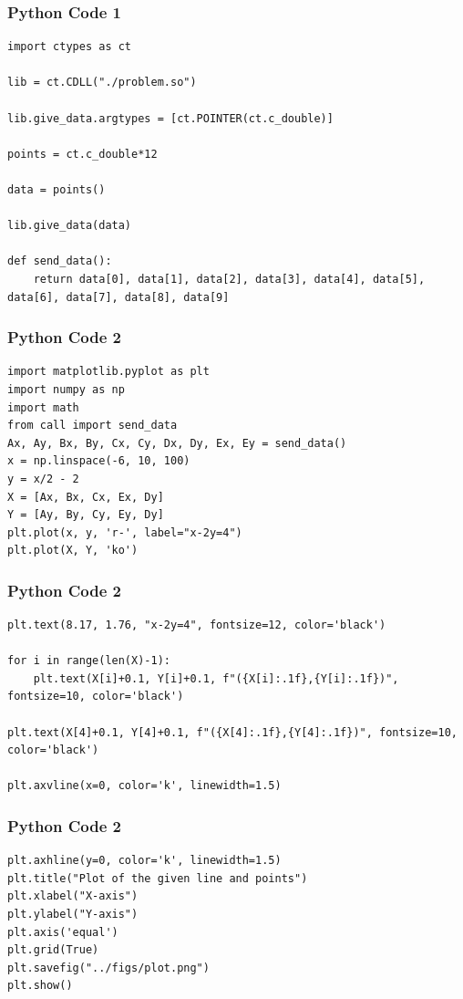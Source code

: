 \documentclass{beamer}
\begin{document}
\begin{frame}[fragile]
    \frametitle{Python Code 1}
    \begin{lstlisting}
import ctypes as ct

lib = ct.CDLL("./problem.so")

lib.give_data.argtypes = [ct.POINTER(ct.c_double)]

points = ct.c_double*12

data = points()

lib.give_data(data)

def send_data():
    return data[0], data[1], data[2], data[3], data[4], data[5], data[6], data[7], data[8], data[9]
    \end{lstlisting}
\end{frame}

\begin{frame}[fragile]
    \frametitle{Python Code 2}
    \begin{lstlisting}
import matplotlib.pyplot as plt
import numpy as np
import math
from call import send_data
Ax, Ay, Bx, By, Cx, Cy, Dx, Dy, Ex, Ey = send_data()
x = np.linspace(-6, 10, 100)   
y = x/2 - 2
X = [Ax, Bx, Cx, Ex, Dy]
Y = [Ay, By, Cy, Ey, Dy]
plt.plot(x, y, 'r-', label="x-2y=4")
plt.plot(X, Y, 'ko')  

    \end{lstlisting}
\end{frame}

\begin{frame}[fragile]
    \frametitle{Python Code 2}
    \begin{lstlisting}
plt.text(8.17, 1.76, "x-2y=4", fontsize=12, color='black')

for i in range(len(X)-1):
    plt.text(X[i]+0.1, Y[i]+0.1, f"({X[i]:.1f},{Y[i]:.1f})", fontsize=10, color='black')

plt.text(X[4]+0.1, Y[4]+0.1, f"({X[4]:.1f},{Y[4]:.1f})", fontsize=10, color='black')

plt.axvline(x=0, color='k', linewidth=1.5)
    \end{lstlisting}
\end{frame}

\begin{frame}[fragile]
    \frametitle{Python Code 2}
    \begin{lstlisting}
plt.axhline(y=0, color='k', linewidth=1.5)
plt.title("Plot of the given line and points")
plt.xlabel("X-axis")
plt.ylabel("Y-axis")
plt.axis('equal')
plt.grid(True)
plt.savefig("../figs/plot.png")
plt.show()
    \end{lstlisting}
\end{frame}
\end{document}
